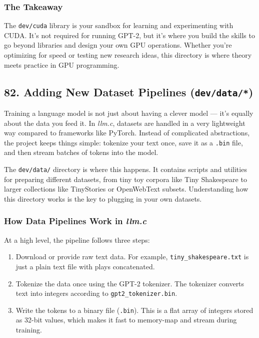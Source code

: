 \documentclass[
  letterpaper,
  DIV=11,
  numbers=noendperiod]{scrreprt}
\providecommand{\tightlist}{%
  \setlength{\itemsep}{0pt}\setlength{\parskip}{0pt}}
\begin{document}
\subsubsection{The Takeaway}\label{the-takeaway-70}

The \texttt{dev/cuda} library is your sandbox for learning and
experimenting with CUDA. It's not required for running GPT-2, but it's
where you build the skills to go beyond libraries and design your own
GPU operations. Whether you're optimizing for speed or testing new
research ideas, this directory is where theory meets practice in GPU
programming.

\subsection{\texorpdfstring{82. Adding New Dataset Pipelines
(\texttt{dev/data/*})}{82. Adding New Dataset Pipelines (dev/data/*)}}\label{adding-new-dataset-pipelines-devdata}

Training a language model is not just about having a clever model ---
it's equally about the data you feed it. In \emph{llm.c}, datasets are
handled in a very lightweight way compared to frameworks like PyTorch.
Instead of complicated abstractions, the project keeps things simple:
tokenize your text once, save it as a \texttt{.bin} file, and then
stream batches of tokens into the model.

The \texttt{dev/data/} directory is where this happens. It contains
scripts and utilities for preparing different datasets, from tiny toy
corpora like Tiny Shakespeare to larger collections like TinyStories or
OpenWebText subsets. Understanding how this directory works is the key
to plugging in your own datasets.

\subsubsection{\texorpdfstring{How Data Pipelines Work in
\emph{llm.c}}{How Data Pipelines Work in llm.c}}\label{how-data-pipelines-work-in-llm.c}

At a high level, the pipeline follows three steps:

\begin{enumerate}
\def\labelenumi{\arabic{enumi}.}
\tightlist
\item
  Download or provide raw text data. For example,
  \texttt{tiny\_shakespeare.txt} is just a plain text file with plays
  concatenated.
\item
  Tokenize the data once using the GPT-2 tokenizer. The tokenizer
  converts text into integers according to \texttt{gpt2\_tokenizer.bin}.
\item
  Write the tokens to a binary file (\texttt{.bin}). This is a flat
  array of integers stored as 32-bit values, which makes it fast to
  memory-map and stream during training.
\end{enumerate}
\end{document}

